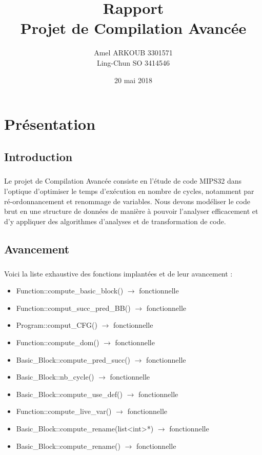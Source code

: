 \documentclass[a4paper,12pt]{report}
\title{\Huge Rapport \\ 
	Projet de Compilation Avancée \\}
\author{
    Amel ARKOUB 3301571 \\
    Ling-Chun SO 3414546}
\date{20 mai 2018}
\begin{document}
\maketitle

\tableofcontents
\newpage

\chapter{Présentation}
\section{Introduction}
\paragraph*{}
Le projet de Compilation Avancée consiste en l'étude de code MIPS32 dans l'optique d'optimiser le temps d'exécution en nombre de cycles, notamment par ré-ordonnancement et renommage de variables. Nous devons modéliser le code brut en une structure de données de manière à pouvoir l'analyser efficacement et d'y appliquer des algorithmes d'analyses et de transformation de code.

\section{Avancement}
\paragraph*{}
Voici la liste exhaustive des fonctions implantées et de leur avancement :
\begin{itemize}
    \item Function::compute\_basic\_block() $\rightarrow$ fonctionnelle
    \item Function::comput\_succ\_pred\_BB() $\rightarrow$ fonctionnelle
    \item Program::comput\_CFG() $\rightarrow$ fonctionnelle
    \item Function::compute\_dom() $\rightarrow$ fonctionnelle
    \item Basic\_Block::compute\_pred\_succ() $\rightarrow$ fonctionnelle
    \item Basic\_Block::nb\_cycle() $\rightarrow$ fonctionnelle
    \item Basic\_Block::compute\_use\_def() $\rightarrow$ fonctionnelle
    \item Function::compute\_live\_var() $\rightarrow$ fonctionnelle
    \item Basic\_Block::compute\_rename(list<int>*) $\rightarrow$ fonctionnelle
    \item Basic\_Block::compute\_rename() $\rightarrow$ fonctionnelle
\end{itemize}
\end{document}
